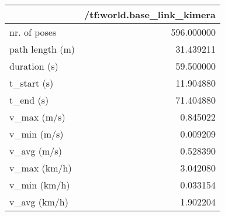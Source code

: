 \begin{tabular}{lr}
\toprule
{} &  /tf:world.base\_link\_kimera \\
\midrule
nr. of poses    &                  596.000000 \\
path length (m) &                   31.439211 \\
duration (s)    &                   59.500000 \\
t\_start (s)     &                   11.904880 \\
t\_end (s)       &                   71.404880 \\
v\_max (m/s)     &                    0.845022 \\
v\_min (m/s)     &                    0.009209 \\
v\_avg (m/s)     &                    0.528390 \\
v\_max (km/h)    &                    3.042080 \\
v\_min (km/h)    &                    0.033154 \\
v\_avg (km/h)    &                    1.902204 \\
\bottomrule
\end{tabular}
